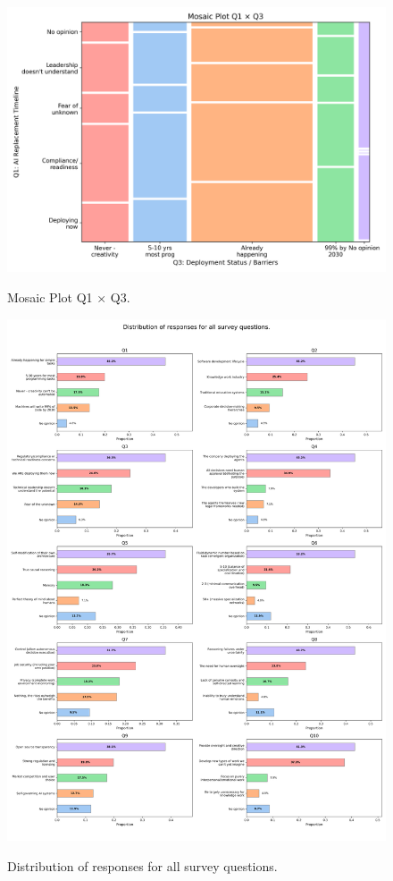 \documentclass{article}
\begin{document}
\begin{figure}[htbp]

{\includegraphics[width=\textwidth, keepaspectratio]{figs/Q1xQ3_mosaic_supplementary_s1.png}}

\caption{Mosaic Plot Q1 × Q3.}

\end{figure}%

\begin{figure}[htbp]

{\includegraphics[width=\textwidth, height=0.8\textheight, keepaspectratio]{figs/all_questions_grid_improved.png}}

\caption{Distribution of responses for all
survey questions.}

\end{figure}%
\end{document}

